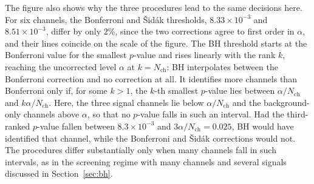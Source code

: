 The figure also shows why the three procedures lead to the same decisions here. For six channels, the Bonferroni and \v{S}id\'ak thresholds, $8.33\times10^{-3}$ and $8.51\times10^{-3}$, differ by only $2\%$, since the two corrections agree to first order in $\alpha$, and their lines coincide on the scale of the figure. The BH threshold starts at the Bonferroni value for the smallest $p$-value and rises linearly with the rank $k$, reaching the uncorrected level $\alpha$ at $k=N_\text{ch}$: BH interpolates between the Bonferroni correction and no correction at all. It identifies more channels than Bonferroni only if, for some $k>1$, the $k$-th smallest $p$-value lies between $\alpha/N_\text{ch}$ and $k\alpha/N_\text{ch}$. Here, the three signal channels lie below $\alpha/N_\text{ch}$ and the background-only channels above $\alpha$, so that no $p$-value falls in such an interval. Had the third-ranked $p$-value fallen between $8.3\times10^{-3}$ and $3\alpha/N_\text{ch}=0.025$, BH would have identified that channel, while the Bonferroni and \v{S}id\'ak corrections would not. The procedures differ substantially only when many channels fall in such intervals, as in the screening regime with many channels and several signals discussed in Section~\ref{sec:bh}.

